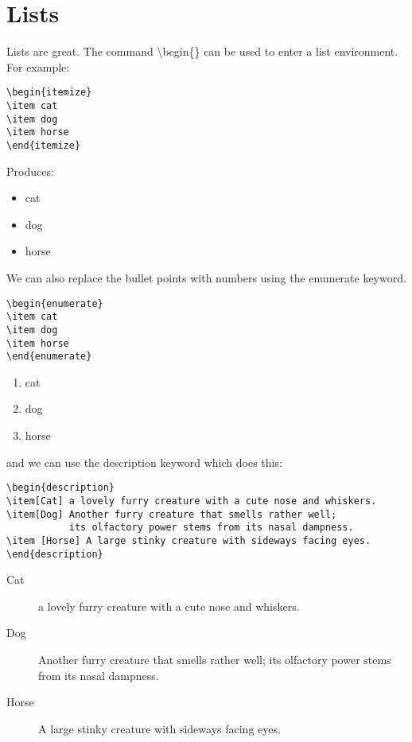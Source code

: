 \chapter{Lists}
Lists are great.  The command {\textbackslash}begin\{\} can be used to enter a list environment.  For example:

\begin{verbatim}
\begin{itemize}
\item cat
\item dog
\item horse
\end{itemize}
\end{verbatim}

Produces:

\begin{itemize}
\item cat
\item dog
\item horse
\end{itemize}

\pagebreak
We can also replace the bullet points with numbers using the enumerate keyword.

\begin{verbatim}
\begin{enumerate}
\item cat
\item dog
\item horse
\end{enumerate}
\end{verbatim}

\begin{enumerate}
\item cat
\item dog
\item horse
\end{enumerate}

\pagebreak
and we can use the description keyword which does this:
\begin{verbatim}
\begin{description}
\item[Cat] a lovely furry creature with a cute nose and whiskers.
\item[Dog] Another furry creature that smells rather well; 
           its olfactory power stems from its nasal dampness.
\item [Horse] A large stinky creature with sideways facing eyes.
\end{description}
\end{verbatim}

\begin{description}
\item[Cat] a lovely furry creature with a cute nose and whiskers.
\item[Dog] Another furry creature that smells rather well; its olfactory power stems from its nasal dampness.
\item [Horse] A large stinky creature with sideways facing eyes.
\end{description}